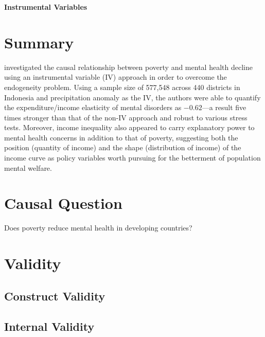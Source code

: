 \begin{center}
    \textbf{Instrumental Variables}
\end{center}

\begin{hangparas}{0.5in}{1}
\end{hangparas}

\bigskip

\section{Summary}

\textcite{hanandita:2014} investigated the causal relationship between poverty and mental health decline using an instrumental variable (IV) approach in order to overcome the endogeneity problem. Using a sample size of 577,548 across 440 districts in Indonesia and precipitation anomaly as the IV, the authors were able to quantify the expenditure/income elasticity of mental disorders as $-0.62$---a result five times stronger than that of the non-IV approach and robust to various stress tests. Moreover, income inequality also appeared to carry explanatory power to mental health concerns in addition to that of poverty, suggesting both the position (quantity of income) and the shape (distribution of income) of the income curve as policy variables worth pursuing for the betterment of population mental welfare.

\section{Causal Question}

Does poverty reduce mental health in developing countries?

\section{Validity}

\subsection{Construct Validity}

\subsection{Internal Validity}

